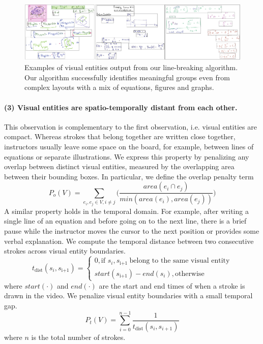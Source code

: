 \begin{figure}[h!]
        \centering
        \includegraphics[width=\textwidth]{figures/visual-lines2.pdf}
        \captionsetup{font=footnotesize}
        \caption{Examples of visual entities output from our line-breaking algorithm.
Our algorithm successfully identifies meaningful groups even from complex
layouts with a mix of equations, figures and graphs.}
        \label{Fig:visual_line_output}
\end{figure}

\paragraph{(3) Visual entities are spatio-temporally distant from each other.} This observation
is complementary to the first observation, i.e. visual entities are
compact. Whereas strokes that belong together are written close
together, instructors usually leave some space on the board, for
example, between lines of equations or separate illustrations. We
express this property by penalizing any overlap between distinct
visual entities, measured by the overlapping
area between their bounding boxes. In particular, we define the overlap
penalty term
\begin{equation}
P_{o}(V) = \sum_{e_i,e_j \in V, i \neq j}\big(\frac{area(e_i\cap e_j)}{min(area(e_i), area(e_j))}\big)
\label{Eq:overlap_penalty}
\end{equation}
A similar property holds in the temporal domain. For example, after
writing a single line of an equation and before going on to the next
line, there is a brief pause while the instructor moves the cursor to
the next position or provides some verbal explanation. We compute the
temporal distance between two consecutive strokes across visual entity
boundaries.
\[
    t_\text{dist}(s_i, s_\text{i+1})= 
\begin{cases}
   0, \text{if } s_i, s_\text{i+1 } \text{belong to the same visual entity}\\
   start(s_\text{i+1}) - end(s_i), \text{otherwise}
\end{cases}
\]
where $start(\cdot)$ and $end(\cdot)$ are the start and end times of
when a stroke is drawn in the video. We penalize visual entity
boundaries with a small temporal gap.
\begin{equation}
P_{t}(V) = \sum_{i = 0}^{n-1}\frac{1}{t_\text{dist}(s_i, s_{i+1})}
\end{equation}
where $n$ is the total number of strokes.\\

